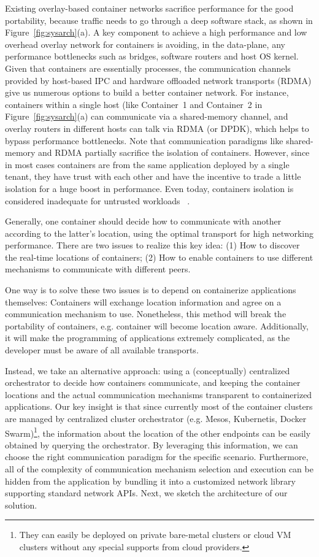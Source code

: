 Existing overlay-based container networks sacrifice performance for 
the good portability, because traffic needs to go through a deep software 
stack, as shown in Figure~\ref{fig:sysarch}(a). 
A key component to achieve a high performance and low overhead overlay network for
containers is avoiding, in the data-plane, any performance bottlenecks such as bridges, software
routers and host OS kernel. Given that containers are essentially
processes, the communication channels provided by host-based IPC and hardware offloaded
network transports (RDMA) give us numerous options to build a better container network. For
instance, containers within a single host (like Container~1 and Container~2 in
Figure~\ref{fig:sysarch}(a)
can communicate via a shared-memory channel, and overlay routers
in different hosts can talk via RDMA (or DPDK), which helps to bypass performance
bottlenecks. Note that communication paradigms like shared-memory and RDMA 
partially sacrifice the isolation of containers. However, since in most cases
containers are from the same application deployed by a single tenant, they
have trust with each other and have the incentive to trade a little isolation
for a huge boost in performance. Even today, containers isolation is considered
inadequate for untrusted workloads~\cite{containers-blackhat,containers-rhel,containers-rhel}
.

Generally, one container should decide how to communicate
with another according to the latter's location, using the optimal transport for high networking performance.
There are two issues to realize this key idea: (1) How to discover the real-time locations of containers; (2) How to enable containers
to use different mechanisms to communicate with different peers.

One way is to solve these two issues is to depend on containerize applications themselves:
Containers will exchange location information and
agree on a communication mechanism to use. Nonetheless, this method will 
break the portability of containers, e.g. container will become location aware. Additionally, it will make the programming of applications extremely
complicated, as the developer must be aware of all available transports.

Instead, we take an alternative approach: using a (conceptually) centralized orchestrator to decide how containers communicate, and keeping the container locations and the 
actual
communication mechanisms transparent to containerized applications. Our key insight is that since currently most of the container clusters are managed by centralized cluster orchestrator (e.g. Mesos, Kubernetis, Docker Swarm)\footnote{They can easily be deployed on private bare-metal clusters or cloud VM clusters without any special supports from cloud providers.}, the information about the location of the other endpoints
can be easily obtained by querying the orchestrator. By leveraging this
information, we can choose the right communication paradigm for the specific
scenario. Furthermore, all of the complexity of communication mechanism selection
and execution can be hidden from the application
by bundling it into a customized network library supporting standard 
network APIs.
Next, we sketch the architecture of our solution.

